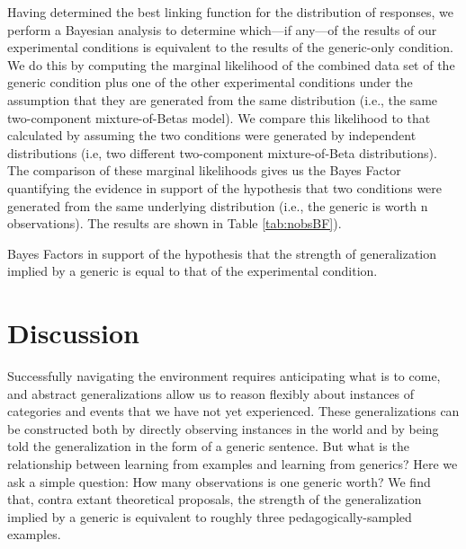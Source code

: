 \documentclass[10pt,letterpaper]{article}
\begin{document}
Having determined the best linking function for the distribution of responses, we perform a Bayesian analysis to determine which---if any---of the results of our experimental conditions is equivalent to the results of the generic-only condition. 
We do this by computing the marginal likelihood of the combined data set of the generic condition plus one of the other experimental conditions under the assumption that they are generated from the same distribution (i.e., the same two-component mixture-of-Betas model). 
We compare this likelihood to that calculated by assuming the two conditions were generated by independent distributions (i.e, two different two-component mixture-of-Beta distributions). 
The comparison of these marginal likelihoods gives us the Bayes Factor quantifying the evidence in support of the hypothesis that two conditions were generated from the same underlying distribution (i.e., the generic is worth n observations). 
The results are shown in Table \ref{tab:nobsBF}).



\begin{center}
  \begin{table}[h]
    \centering
    \caption{Bayes Factors in support of the hypothesis that the strength of generalization implied by a generic is equal to that of the experimental condition.}
    \label{tab:nobsBF}
  \end{table}
\end{center}






\section{Discussion}

Successfully navigating the environment requires anticipating what is to come, and abstract generalizations allow us to reason flexibly about instances of categories and events that we have not yet experienced. 
These generalizations can be constructed both by directly observing instances in the world and by being told the generalization in the form of a generic sentence. 
But what is the relationship between learning from examples and learning from generics? 
Here we ask a simple question: How many observations is one generic worth?
We find that, contra extant theoretical proposals, the strength of the generalization implied by a generic is equivalent to roughly three pedagogically-sampled examples. 
\end{document}
